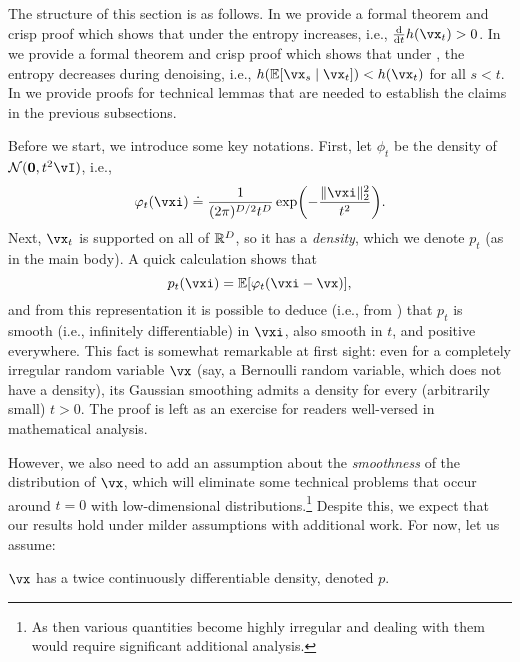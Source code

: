 \documentclass[../../book-main.tex]{subfiles}
\begin{document}
The structure of this section is as follows. In  we provide a formal theorem and crisp proof which shows that under  the entropy increases, i.e., \(\odv*{h(\vx_{t})}{t} > 0\). In  we provide a formal theorem and crisp proof which shows that under , the entropy decreases during denoising, i.e., \(h(\Ex[\vx_{s} \given \vx_{t}]) < h(\vx_{t})\) for all \(s < t\). In  we provide proofs for technical lemmas that are needed to establish the claims in the previous subsections.

Before we start, we introduce some key notations. First, let \(\phi_{t}\) be the density of \(\dNorm(\vzero, t^{2}\vI)\), i.e.,
\begin{equation}\label{eq:gaussian_noise_time_t}
    \phi_{t}(\vxi) \doteq \frac{1}{(2\pi)^{D/2}t^{D}}\exp\rp{-\frac{\norm{\vxi}_{2}^{2}}{t^{2}}}.
\end{equation}
Next, \(\vx_{t}\) is supported on all of \(\mathbb{R}^{D}\), so it has a \textit{density}, which we denote \(p_{t}\) (as in the main body). A quick calculation shows that
\begin{equation}\label{eq:p_t_representation}
    p_{t}(\vxi) = \Ex[\phi_{t}(\vxi - \vx)],
\end{equation}
and from this representation it is possible to deduce (i.e., from ) that \(p_{t}\) is smooth (i.e., infinitely differentiable) in \(\vxi\), also smooth in \(t\), and positive everywhere. This fact is somewhat remarkable at first sight: even for a completely irregular random variable \(\vx\) (say, a Bernoulli random variable, which does not have a density), its Gaussian smoothing admits a density for every (arbitrarily small) \(t > 0\). The proof is left as an exercise for readers well-versed in mathematical analysis.

However, we also need to add an assumption about the \textit{smoothness} of the distribution of \(\vx\), which will eliminate some technical problems that occur around \(t = 0\) with low-dimensional distributions.\footnote{As then various quantities become highly irregular and dealing with them would require significant additional analysis.} Despite this, we expect that our results hold under milder assumptions with additional work. For now, let us assume:
\begin{assumption}\label{assumption:entropy_x_density}
    \(\vx\) has a twice continuously differentiable density, denoted \(p\).
\end{assumption}
\end{document}
